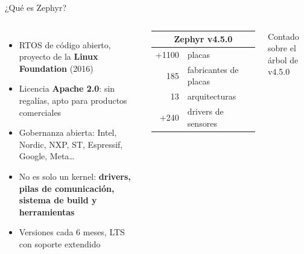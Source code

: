 \documentclass[aspectratio=169]{beamer}
\begin{document}
\begin{frame}{¿Qué es Zephyr?}
\begin{columns}[T]
\begin{itemize}
    \item RTOS de código abierto, proyecto de la \textbf{Linux Foundation} (2016)
    \item Licencia \textbf{Apache 2.0}: sin regalías, apto para productos comerciales
    \item Gobernanza abierta: Intel, Nordic, NXP, ST, Espressif, Google, Meta\ldots
    \item No es solo un kernel: \textbf{drivers, pilas de comunicación, sistema de build y herramientas}
    \item Versiones cada 6 meses, LTS con soporte extendido
\end{itemize}
\centering
\renewcommand{\arraystretch}{1.3}
\begin{tabular}{rl}
\toprule
\multicolumn{2}{c}{\textbf{Zephyr v4.5.0}} \\
\midrule
\alert{\Large +1100} & placas \\
\alert{\Large 185} & fabricantes de placas \\
\alert{\Large 13} & arquitecturas \\
\alert{\Large +240} & drivers de sensores \\
\bottomrule
\end{tabular}

\vspace{0.3em}
{\tiny Contado sobre el árbol de v4.5.0}
\end{columns}
\end{frame}
\end{document}
